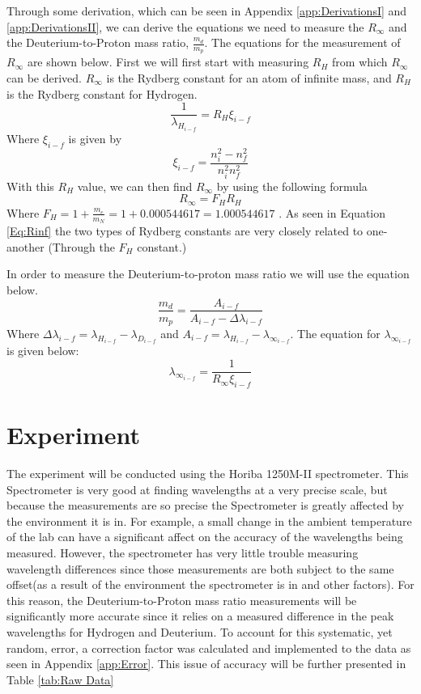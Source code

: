 \documentclass[%
 aps,%
 pra,%
 preprint, %
 amsmath, %
 amsfonts, %
 amssymb, %
]{revtex4-2}
\newcommand{\D}{Deuterium}
\newcommand{\Rin}{$R_\infty$ }
\begin{document}
Through some derivation, which can be seen in Appendix \ref{app:DerivationsI} and \ref{app:DerivationsII}, we can derive the equations we need to measure the $R_\infty$ and the \D-to-Proton mass ratio, $\frac{m_d}{m_p}$. The equations for the measurement of $R_\infty$ are shown below. First we will first start with measuring $R_H$ from which $R_\infty$ can be derived. \Rin is the Rydberg constant for an atom of infinite mass, and $R_H$ is the Rydberg constant for Hydrogen. 
\begin{equation}
\label{Eq:RH}
    \frac{1}{\lambda_{H_{i-f}}}=R_H\xi_{i-f}
\end{equation}
Where $\xi_{i-f}$ is given by
\begin{equation}
    \label{Eq:xi}
    \xi_{i-f}=\frac{n_i^2-n_f^2}{n_i^2n_f^2}
\end{equation}{}
With this $R_H$ value, we can then find $R_\infty$ by using the following formula
\begin{equation}
\label{Eq:Rinf}
    R_\infty=F_HR_H
\end{equation}{}
Where $F_H=1+\frac{m_e}{m_N}=1+0.000544617=1.000544617$ \cite{CODATA2020}. As seen in Equation \ref{Eq:Rinf} the two types of Rydberg constants are very closely related to one-another (Through the $F_H$ constant.)

In order to measure the \D-to-proton mass ratio we will use the equation below. 
\begin{equation}
    \label{Eq:md-mp}
    \frac{m_d}{m_p}=\frac{A_{i-f}}{A_{i-f}-\Delta\lambda_{i-f}}
\end{equation}{}
Where $\Delta\lambda_{i-f}=\lambda_{H_{i-f}}-\lambda_{D_{i-f}}$ and $A_{i-f}=\lambda_{H_{i-f}}-\lambda_{\infty_{i-f}}$. The equation for $\lambda_{\infty_{i-f}}$ is given below:
\begin{equation}
    \lambda_{\infty_{i-f}}=\frac{1}{R_\infty \xi_{i-f} }
\end{equation}{}


\section{\label{sec:Experiment} Experiment}
The experiment will be conducted using the Horiba 1250M-II spectrometer. This Spectrometer is very good at finding wavelengths at a very precise scale, but because the measurements are so precise the Spectrometer is greatly affected by the environment it is in. For example, a small change in the ambient temperature of the lab can have a significant affect on the accuracy of the wavelengths being measured. However, the spectrometer has very little trouble measuring wavelength differences since those measurements are both subject to the same offset(as a result of the environment the spectrometer is in and other factors). For this reason, the \D-to-Proton mass ratio measurements will be significantly more accurate since it relies on a measured difference in the peak wavelengths for Hydrogen and \D. To account for this systematic, yet random, error, a correction factor was calculated and implemented to the data as seen in Appendix \ref{app:Error}. This issue of accuracy will be further presented in Table \ref{tab:Raw Data}
\end{document}
